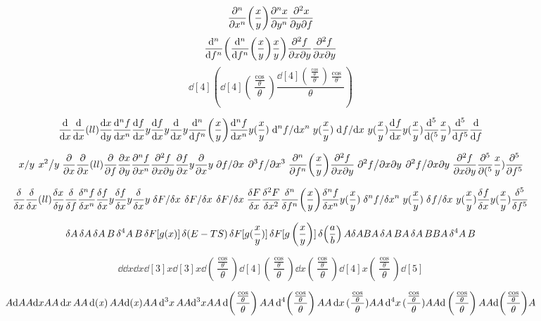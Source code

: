 \documentclass{article}
\DeclareMathOperator{\ddx}{{\rm d}(\it x)}
\begin{document}
\[
  \pdv[n]{x}(\frac{x}{y})
  \pdv[n]{x}{y}(\frac{x}{y})
  \pdv[n]{x}{y}{f}(\frac{x}{y})
\]
\[
  \dv[n]{f}(\dv[n]{f}(\frac{x}{y})\frac{x}{y})
  \pdv[n]{f}{x}{y}(\pdv[n]{f}{x}{y}(\frac{x}{y})\frac{x}{y})
  \pdv{f}{x}{y}(\pdv{f}{x}{y}(\frac{x}{y})\frac{x}{y})
\]
\[
  \dd[4](\dd[4](\frac{\frac{\cos}{\theta}}{\theta})\frac{\dd[4](\frac{\frac{\cos}{\theta}}{\theta})\frac{\cos}{\theta}}{\theta})
\]

\[
  \dv x
  \dv x(ll)
  \dv{x}{y}
  \dv[n]{f}{x}
  \dv{f}{x}{y}
  \dv{f}{x}y
  \dv{x}y
  \dv[n]{f}(\frac{x}{y})
  \dv[n]{f}{x}{y}(\frac{x}{y})
  \dv*[n]{f}{x}{y}(\frac{x}{y})
  \dv*[]{f}{x}{y}(\frac{x}{y})
  \dv[]{f}{x}{y}(\frac{x}{y})
  \dv[5](\frac{x}{y})
  \dv[5]{f}
  \dv{f}
\]

\[
  \flatfrac{x}{y}
  \flatfrac{x^2}{y}
  \pdv x
  \pdv x(ll)
  \pdv{f}
  \pdv{x}{y}
  \pdv[n]{f}{x}
  \pdv{f}{x}{y}
  \pdv{f}{x}y
  \pdv{x}y
  \pdv*{f}{x}
  \pdv*[3]{f}{x}
  \pdv[n]{f}(\frac{x}{y})
  \pdv[n]{f}{x}{y}(\frac{x}{y})
  \pdv*[n]{f}{x}{y}(\frac{x}{y})
  \pdv*[]{f}{x}{y}(\frac{x}{y})
  \pdv[]{f}{x}{y}(\frac{x}{y})
  \pdv[5](\frac{x}{y})
  \pdv[5]{f}
\]

\[
  \fdv x
  \fdv x(ll)
  \fdv{x}{y}
  \fdv{f}
  \fdv[n]{f}{x}
  \fdv{f}{x}{y}
  \fdv{f}{x}y
  \fdv{x}y
  \functionalderivative*{F}{x}
  \fderivative*{F}{x}
  \fdv*{F}{x}
  \fdv{F}{x}
  \fdv[2]{F}{x}
  \fdv[n]{f}(\frac{x}{y})
  \fdv[n]{f}{x}{y}(\frac{x}{y})
  \fdv*[n]{f}{x}{y}(\frac{x}{y})
  \fdv*[]{f}{x}{y}(\frac{x}{y})
  \fdv[]{f}{x}{y}(\frac{x}{y})
  \fdv[5]{f}
\]

\[
  \var A
  \var{A}
  \var{A}{B}
  \var[4]{A} B
  \var{F[g(x)]}
  \var(E-TS)
  \var{F[g(\frac{x}{y})]}
  \var{F[g\left(\frac{x}{y}\right)]}
  \var(\frac{a}{b})
  A \var A B
  A \var{A} B
  A \var{A}{B} B
  A \var[4]{A} B
\]


\[
  \dd
  \dd x
  \dd{x}
  \dd[3]{x}
  \dd[3]x
  \dd(\frac{\frac{\cos}{\theta}}{\theta})
  \dd[4](\frac{\frac{\cos}{\theta}}{\theta})
  \dd{x}(\frac{\frac{\cos}{\theta}}{\theta})
  \dd[4]{x}(\frac{\frac{\cos}{\theta}}{\theta})
  \dd[5]
\]

\[
  A\dd A
  A\dd x A
  A\dd{x} A
  A\ddx A
  A{{\rm d}(\it x)}A
  A\dd[3]{x} A
  A\dd[3]x A
  A\dd(\frac{\frac{\cos}{\theta}}{\theta}) A
  A\dd[4](\frac{\frac{\cos}{\theta}}{\theta})A
  A\dd{x}(\frac{\frac{\cos}{\theta}}{\theta})A
  A\dd[4]{x}(\frac{\frac{\cos}{\theta}}{\theta})A
  A{\rm d}\left(\frac{\frac{\cos}{\theta}}{\theta}\right) A
  A{\rm d}{\left(\frac{\frac{\cos}{\theta}}{\theta}\right)} A
\]
\end{document}
